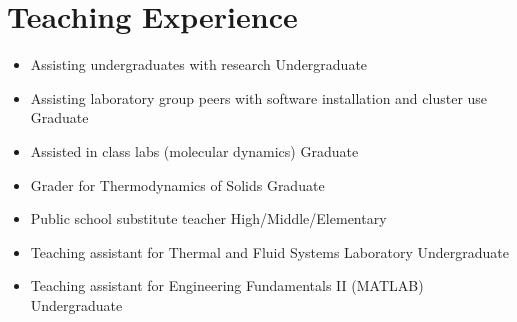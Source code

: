 \section{Teaching Experience}

\begin{itemize}
    \item Assisting undergraduates with research \hfill Undergraduate
    \item Assisting laboratory group peers with software installation and cluster use \hfill Graduate
    \item Assisted in class labs (molecular dynamics) \hfill Graduate
    \item Grader for Thermodynamics of Solids \hfill Graduate
    \item Public school substitute teacher \hfill High/Middle/Elementary
    \item Teaching assistant for Thermal and Fluid Systems Laboratory \hfill Undergraduate
    \item Teaching assistant for Engineering Fundamentals II (MATLAB) \hfill Undergraduate
\end{itemize}
